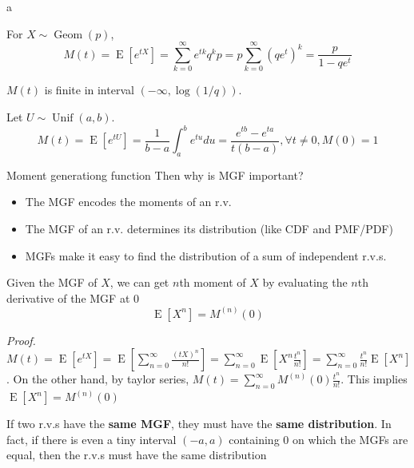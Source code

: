 \documentclass[8pt]{beamer}
\newcommand{\tb}[1]{\textbf{#1}}
\newcommand{\ti}[1]{\textit{#1}}
\newcommand{\myunif}[2]{\operatorname{Unif}\!\left(#1, #2\right)}
\newcommand{\mygeom}[1]{\operatorname{Geom}\!\left(#1\right)}
\newcommand{\expec}[1]{\operatorname{E}\left[ #1 \right]}
\begin{document}
\begin{frame}{a}
    \begin{example}
        For $X \sim \mygeom{p}$,
        \[
        M(t) = \expec{e^{tX}} = \sum_{k=0}^\infty e^{tk} q^k p = p \sum_{k=0}^\infty (qe^t)^k = \frac{p}{1 - qe^t}
        \]

        $M(t)$ is finite in interval $(-\infty, \log{(1/q)})$.
    \end{example}

    \begin{example}
        Let $U \sim \myunif{a}{b}$.
        \[
        M(t) = \expec{e^{tU}} = \frac{1}{b-a} \int_a^b e^{tu} du = \frac{e^{tb} - e^{ta}}{t (b-a)}, \forall t \neq  0, M(0) = 1
        \]
    \end{example}
\end{frame}

\begin{frame}{Moment generationg function}
    Then why is MGF important?
    \begin{itemize}
        \item The MGF encodes the moments of an r.v.
        \item The MGF of an r.v. determines its distribution (like CDF and PMF/PDF)
        \item MGFs make it easy to find the distribution of a sum of independent r.v.s.
    \end{itemize}
    \begin{theorem}
        Given the MGF of $X$, we can get $n$th moment of $X$ by evaluating the $n$th derivative of the MGF at $0$
        \[
            \expec{X^n} = M^{(n)}(0)
        \]
    \end{theorem}

    \ti{Proof.} $M(t) = \expec{e^{tX}} = \expec{\sum_{n=0}^\infty \frac{(tX)^n}{n!}} = \sum_{n=0}^\infty \expec{X^n \frac{t^n}{n!}} = \sum_{n=0}^\infty \frac{t^n}{n!} \expec{X^n}$.
    On the other hand, by taylor series, $M(t) = \sum_{n=0}^\infty M^{(n)}(0) \frac{t^n}{n!}$. This implies $\expec{X^n} = M^{(n)}(0)$

    \begin{theorem}
        If two r.v.s have the \tb{same MGF}, they must have the \tb{same distribution}. In fact, if there is even a tiny interval $(-a, a)$ containing $0$ on which the MGFs are equal, then the r.v.s must have the same distribution
    \end{theorem}
\end{frame}
\end{document}
